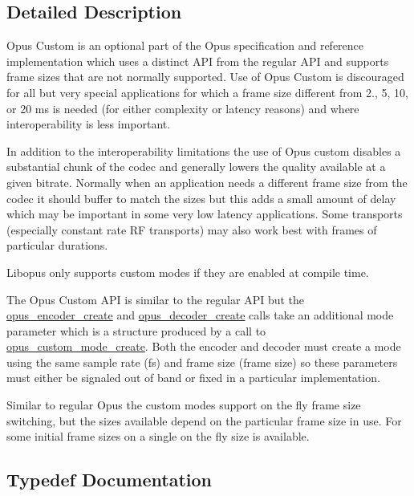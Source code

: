 \subsection{Detailed Description}
Opus Custom is an optional part of the Opus specification and reference implementation which uses a distinct A\+PI from the regular A\+PI and supports frame sizes that are not normally supported. Use of Opus Custom is discouraged for all but very special applications for which a frame size different from 2., 5, 10, or 20 ms is needed (for either complexity or latency reasons) and where interoperability is less important. 

In addition to the interoperability limitations the use of Opus custom disables a substantial chunk of the codec and generally lowers the quality available at a given bitrate. Normally when an application needs a different frame size from the codec it should buffer to match the sizes but this adds a small amount of delay which may be important in some very low latency applications. Some transports (especially constant rate RF transports) may also work best with frames of particular durations.

Libopus only supports custom modes if they are enabled at compile time.

The Opus Custom A\+PI is similar to the regular A\+PI but the \hyperlink{group__opus__encoder_gaa89264fd93c9da70362a0c9b96b9ca88}{opus\+\_\+encoder\+\_\+create} and \hyperlink{group__opus__decoder_ga753f6fe0b699c81cfd47d70c8e15a0bd}{opus\+\_\+decoder\+\_\+create} calls take an additional mode parameter which is a structure produced by a call to \hyperlink{group__opus__custom_ga8d6683d0b9f2990a8f54d8bafe4f4027}{opus\+\_\+custom\+\_\+mode\+\_\+create}. Both the encoder and decoder must create a mode using the same sample rate (fs) and frame size (frame size) so these parameters must either be signaled out of band or fixed in a particular implementation.

Similar to regular Opus the custom modes support on the fly frame size switching, but the sizes available depend on the particular frame size in use. For some initial frame sizes on a single on the fly size is available. 

\subsection{Typedef Documentation}
